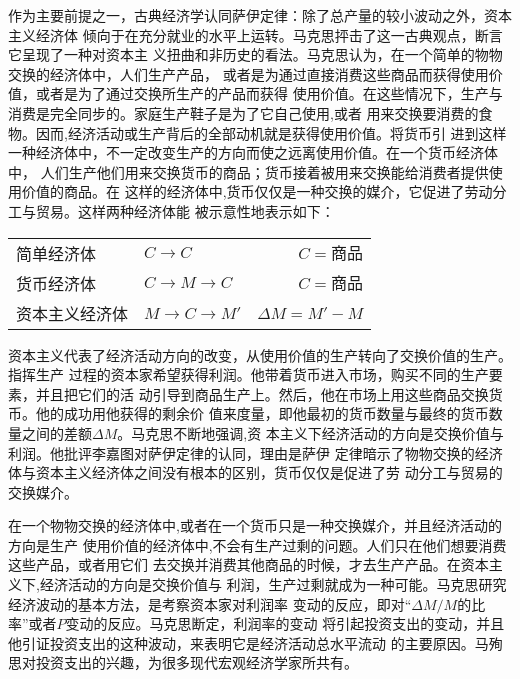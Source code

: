 作为主要前提之一，古典经济学认同萨伊定律：除了总产量的较小波动之外，资本主义经济体
倾向于在充分就业的水平上运转。马克思抨击了这一古典观点，断言它呈现了一种对资本主
义扭曲和非历史的看法。马克思认为，在一个简单的物物交换的经济体中，人们生产产品，
或者是为通过直接消费这些商品而获得使用价值，或者是为了通过交换所生产的产品而获得
使用价值。在这些情况下，生产与消费是完全同步的。家庭生产鞋子是为了它自己使用,或者
用来交换要消费的食物。因而,经济活动或生产背后的全部动机就是获得使用价值。将货币引
进到这样一种经济体中，不一定改变生产的方向而使之远离使用价值。在一个货币经济体中，
人们生产他们用来交换货币的商品；货币接着被用来交换能给消费者提供使用价值的商品。在
这样的经济体中,货币仅仅是一种交换的媒介，它促进了劳动分工与贸易。这样两种经济体能
被示意性地表示如下：
\begin{table}[htbp]
  \centering
    \begin{tabular}{@{}llr@{}}
     简单经济体 &  $C \rightarrow C$ & $C=商品$ \\
     货币经济体 &  $C \rightarrow M \rightarrow C$ & $C=商品$ \\
     资本主义经济体 &  $ M \rightarrow C \rightarrow M'$ & $\Delta M = M' - M$
    \end{tabular}%
\end{table}

资本主义代表了经济活动方向的改变，从使用价值的生产转向了交换价值的生产。指挥生产
过程的资本家希望获得利润。他带着货币进入市场，购买不同的生产要素，并且把它们的活
动引导到商品生产上。然后，他在市场上用这些商品交换货币。他的成功用他获得的剩余价
值来度量，即他最初的货币数量与最终的货币数量之间的差额$\Delta M$。马克思不断地强调,资
本主义下经济活动的方向是交换价值与利润。他批评李嘉图对萨伊定律的认同，理由是萨伊
定律暗示了物物交换的经济体与资本主义经济体之间没有根本的区别，货币仅仅是促进了劳
动分工与贸易的交换媒介。

在一个物物交换的经济体中,或者在一个货币只是一种交换媒介，并且经济活动的方向是生产
使用价值的经济体中,不会有生产过剩的问题。人们只在他们想要消费这些产品，或者用它们
去交换并消费其他商品的时候，才去生产产品。在资本主义下,经济活动的方向是交换价值与
利润，生产过剩就成为一种可能。马克思研究经济波动的基本方法，是考察资本家对利润率
变动的反应，即对“$\Delta M/M$的比率”或者$P$变动的反应。马克思断定，利润率的变动
将引起投资支出的变动，并且他引证投资支出的这种波动，来表明它是经济活动总水平流动
的主要原因。马殉思对投资支出的兴趣，为很多现代宏观经济学家所共有。

